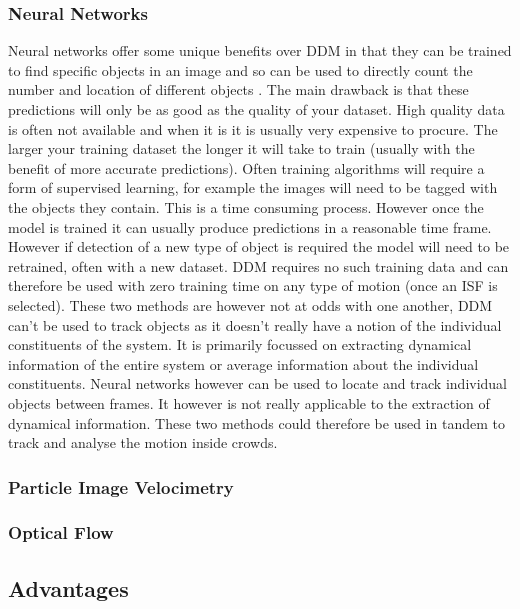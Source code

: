 \documentclass[11pt]{article}
\begin{document}
\subsubsection{Neural Networks}
Neural networks offer some unique benefits over DDM in that they can be trained to find specific objects in an image and so can be used to directly count the number and location of different objects \cite{yolov3}. The main drawback is that these predictions will only be as good as the quality of your dataset. High quality data is often not available and when it is it is usually very expensive to procure. The larger your training dataset the longer it will take to train (usually with the benefit of more accurate predictions). Often training algorithms will require a form of supervised learning, for example the images will need to be tagged with the objects they contain. This is a time consuming process. However once the model is trained it can usually produce predictions in a reasonable time frame. However if detection of a new type of object is required the model will need to be retrained, often with a new dataset. \cite{tensorflow} DDM requires no such training data and can therefore be used with zero training time on any type of motion (once an ISF is selected). These two methods are however not at odds with one another, DDM can't be used to track objects as it doesn't really have a notion of the individual constituents of the system. It is primarily focussed on extracting dynamical information of the entire system or average information about the individual constituents. Neural networks however can be used to locate and track individual objects between frames. It however is not really applicable to the extraction of dynamical information. These two methods could therefore be used in tandem to track and analyse the motion inside crowds.

\subsubsection{Particle Image Velocimetry}


\subsubsection{Optical Flow}

\subsection{Advantages}
\end{document}
